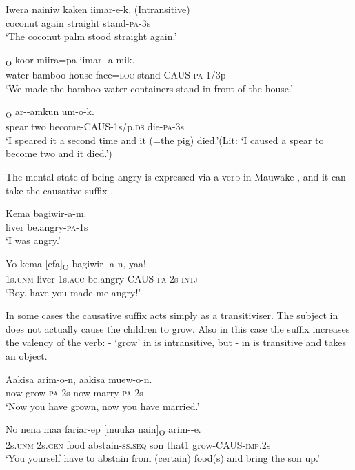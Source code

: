\ea%
\label{ex:3:x997}
\gll Iwera nainiw kaken iimar-e-k. (Intransitive) \\
coconut again straight stand-\textsc{pa}-3s\\
\glt`The coconut palm stood straight again.'
\z

\ea%
\label{ex:3:x998}
\textsubscript{O} koor miira=pa iimar--a-mik. \\
water bamboo house face=\textsc{loc} stand-CAUS-\textsc{pa}-1/3p\\
\glt`We made the bamboo water containers stand in front of the house.'
\z

\ea%
\label{ex:3:x992}
\textsubscript{O} ar--amkun um-o-k. \\
spear two become-CAUS-1s/p.\textsc{ds} die-\textsc{pa}-3s\\
\glt`I speared it a second time and it (=the pig) died.'(Lit: `I caused a spear to become two and it died.')
\z

The mental state of being angry is expressed via a verb in Mauwake , and it can take the causative suffix .

\ea%
\label{ex:3:x993}
\gll Kema bagiwir-a-m. \\
liver be.angry-\textsc{pa}-1s\\
\glt`I was angry.'
\z

\ea%
\label{ex:3:x994}
\gll Yo kema [efa]\textsubscript{O} bagiwir--a-n, yaa! \\
1s.\textsc{unm} liver 1s.\textsc{acc} be.angry-CAUS-\textsc{pa}-2s \textsc{intj}\\
\glt`Boy, have you made me angry!'
\z

In some cases the causative suffix acts simply as a transitiviser. The subject in  does not actually cause the children to grow. Also in this case the suffix increases the valency of the verb: - `grow' in  is intransitive, but - in  is transitive and takes an object.

\ea%
\label{ex:3:x995}
\gll Aakisa arim-o-n, aakisa muew-o-n. \\
now grow-\textsc{pa}-2s now marry-\textsc{pa}-2s\\
\glt`Now you have grown, now you have married.'
\z

\ea%
\label{ex:3:x996}
\gll No nena maa fariar-ep [muuka nain]\textsubscript{O} arim--e.\\
2s.\textsc{unm} 2s.\textsc{gen} food abstain-\textsc{ss}.\textsc{seq} son that1 grow-CAUS-\textsc{imp}.2s\\
\glt`You yourself have to abstain from (certain) food(s) and bring the son up.'
\z


